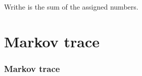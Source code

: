 \documentclass[10pt]{beamer}
\theoremstyle{definition}
\newcommand{\slantbox}[2][0]{\mbox{%
		\sbox{\foobox}{#2}%
		\hskip\wd\foobox
		\pdfsave
		\pdfsetmatrix{1 0 #1 1}%
		\llap{\usebox{\foobox}}%
		\pdfrestore
	}}
\newcommand\unslant[2][-.25]{\slantbox[#1]{$#2$}}
\newcommand{\sigmaa}{\unslant\sigma\!}
\begin{document}
\begin{frame}
\begin{figure}
{\begin{tikzpicture}[scale=0.7]

			\end{tikzpicture}}

			\label{fig:geometricbraidgeneratorssign}
		\end{figure}

		Writhe is the sum of the assigned numbers.
	\end{frame}

	\section{Markov trace}

	\begin{frame}
		\frametitle{Markov trace}
	\end{frame}
\end{document}
